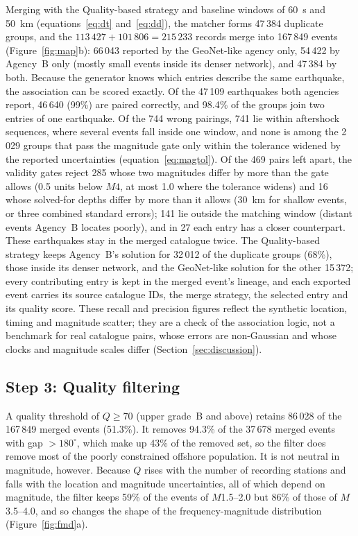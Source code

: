 \documentclass[12pt]{article}
\begin{document}
Merging with the Quality-based strategy and baseline windows of 60~s and 50~km
(equations~\eqref{eq:dt} and~\eqref{eq:dd}), the matcher forms 47\,384 duplicate
groups, and the $113\,427 + 101\,806 = 215\,233$ records merge into 167\,849
events (Figure~\ref{fig:map}b): 66\,043 reported by the GeoNet-like agency only,
54\,422 by Agency~B only (mostly small events inside its denser network), and
47\,384 by both.  Because the generator knows which entries describe the same
earthquake, the association can be scored exactly.  Of the 47\,109 earthquakes
both agencies report, 46\,640 (99\%) are paired correctly, and 98.4\% of the
groups join two entries of one earthquake.  Of the 744 wrong pairings, 741 lie
within aftershock sequences, where several events fall inside one window, and
none is among the 2\,029 groups that pass the magnitude gate only within the
tolerance widened by the reported uncertainties (equation~\eqref{eq:magtol}).
Of the 469 pairs left
apart, the validity gates reject 285 whose two magnitudes differ by more than the
gate allows (0.5 units below $M4$, at most 1.0 where the tolerance widens) and 16
whose solved-for depths differ by more than it allows (30~km for shallow events,
or three combined standard errors); 141 lie outside the matching window (distant
events Agency~B locates poorly), and in 27 each entry has a closer counterpart.
These earthquakes stay in the merged catalogue twice.
The Quality-based strategy keeps Agency~B's solution for 32\,012 of the duplicate
groups (68\%), those inside its denser network, and the GeoNet-like solution for
the other 15\,372; every contributing entry is kept in the merged event's
lineage, and each exported event carries its source catalogue IDs, the merge
strategy, the selected entry and its quality score.  These recall and precision
figures reflect the synthetic location, timing and magnitude scatter; they are a
check of the association logic, not a benchmark for real catalogue pairs, whose
errors are non-Gaussian and whose clocks and magnitude scales differ
(Section~\ref{sec:discussion}).

\subsection{Step 3: Quality filtering}

A quality threshold of $Q \geq 70$ (upper grade~B and above) retains 86\,028 of
the 167\,849 merged events (51.3\%).  It removes 94.3\% of the 37\,678 merged
events with gap $> 180^{\circ}$, which make up 43\% of the removed set, so the
filter does remove most of the poorly constrained offshore population.  It is not
neutral in magnitude, however.  Because $Q$ rises with the number of recording
stations and falls with the location and magnitude uncertainties, all of which
depend on magnitude, the filter keeps 59\% of the events of $M$1.5--2.0 but 86\%
of those of $M$3.5--4.0, and so changes the shape of the frequency-magnitude
distribution (Figure~\ref{fig:fmd}a).
\end{document}

